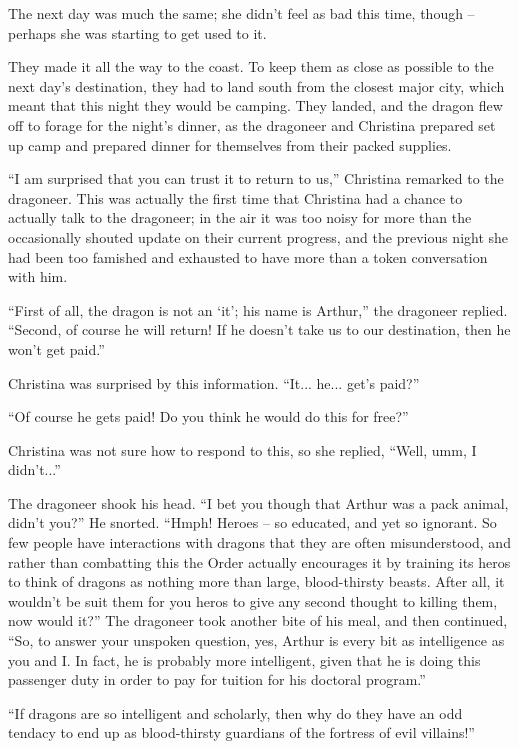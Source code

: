 \documentclass[showtrims,b6paper,draft,10pt]{memoir}
\begin{document}
The next day was much the same;  she didn't feel as bad this time, though -- perhaps she was starting to get used to it.

They made it all the way to the coast.  To keep them as close as possible to the next day's destination, they had to land south from the closest major city, which meant that this night they would be camping.  They landed, and the dragon flew off to forage for the night's dinner, as the dragoneer and Christina prepared set up camp and prepared dinner for themselves from their packed supplies.

``I am surprised that you can trust it to return to us,''  Christina remarked to the dragoneer.  This was actually the first time that Christina had a chance to actually talk to the dragoneer;  in the air it was too noisy for more than the occasionally shouted update on their current progress, and the previous night she had been too famished and exhausted to have more than a token conversation with him.

``First of all, the dragon is not an `it';  his name is Arthur,'' the dragoneer replied.  ``Second, of course he will return!  If he doesn't take us to our destination, then he won't get paid.''

Christina was surprised by this information.  ``It... he... get's paid?''

``Of course he gets paid!  Do you think he would do this for free?''

Christina was not sure how to respond to this, so she replied, ``Well, umm, I didn't...''

The dragoneer shook his head.  ``I bet you though that Arthur was a pack animal, didn't you?''   He snorted.  ``Hmph!  Heroes -- so educated, and yet so ignorant.  So few people have interactions with dragons that they are often misunderstood, and rather than combatting this the Order actually encourages it by training its heros to think of dragons as nothing more than  large, blood-thirsty beasts.  After all, it wouldn't be suit them for you heros to give any second thought to killing them, now would it?''  The dragoneer took another bite of his meal, and then continued,  ``So, to answer your unspoken question, yes, Arthur is every bit as intelligence as you and I.  In fact, he is probably more intelligent, given that he is doing this passenger duty in order to pay for tuition for his doctoral program.''

``If dragons are so intelligent and scholarly, then why do they have an odd tendacy to end up as blood-thirsty guardians of the fortress of evil villains!''
\end{document}
